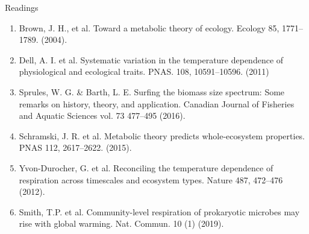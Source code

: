 \documentclass[xcolor={usenames,x11names},compress]{beamer}
\renewcommand{\(}{\begin{columns}}
\renewcommand{\)}{\end{columns}}
\newcommand{\<}[1]{\begin{column}{#1}}
\renewcommand{\>}{\end{column}}
\begin{document}
\begin{frame}{Readings}

  \begin{enumerate}\itemsep2pt

    \item Brown, J. H.,  et al. Toward a metabolic theory of ecology. Ecology 85, 1771--1789. (2004). 

    \item Dell, A. I. et al. Systematic variation in the temperature dependence
      of physiological and ecological traits. PNAS. 108, 10591--10596. (2011)
    
    \item Sprules, W. G. \& Barth, L. E. Surfing the biomass size spectrum: Some remarks on history, theory, and application. Canadian Journal of Fisheries and Aquatic Sciences vol. 73 477--495 (2016).
    
    \item Schramski, J. R. et al. Metabolic theory predicts whole-ecosystem properties. PNAS 112, 2617--2622. (2015).
    
    \item Yvon-Durocher, G. et al. Reconciling the temperature dependence of respiration across timescales and ecosystem types. Nature 487, 472--476 (2012).

    \item Smith, T.P. et al. Community-level respiration of prokaryotic microbes
    may rise with global warming. Nat. Commun. 10 (1) (2019). 

  \end{enumerate}


\end{frame}
\end{document}
